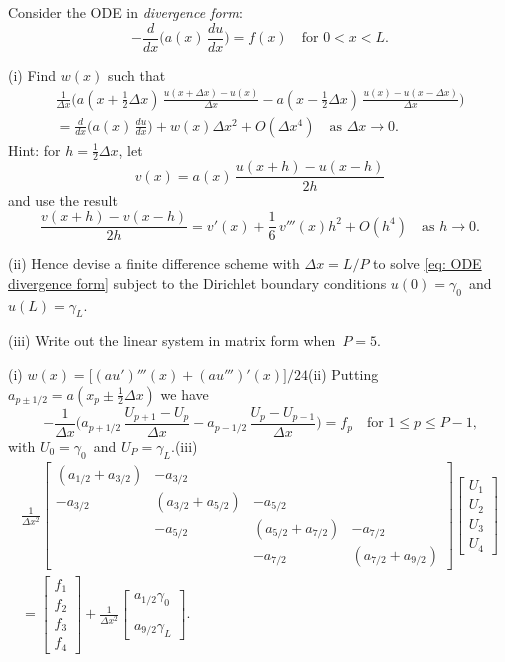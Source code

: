 \begin{Exercises}
\exercise
Consider the ODE in \emph{divergence form}:
\begin{equation}\label{eq: ODE divergence form}
-\frac{d}{dx}\biggl(a(x)\,\frac{du}{dx}\biggr)=f(x)\quad\text{for $0<x<L$.}
\end{equation}
\begin{description}
\item{(i)}
Find $w(x)$ such that
\begin{multline*}
\frac{1}{\Delta x}\biggl(
 a(x+\tfrac12\Delta x)\,\frac{u(x+\Delta x)-u(x)}{\Delta x}
-a(x-\tfrac12\Delta x)\,\frac{u(x)-u(x-\Delta x)}{\Delta x}\biggr)\\
    =\frac{d}{dx}\biggl(a(x)\,\frac{du}{dx}\biggr)+w(x)\Delta x^2+O(\Delta x^4)
    \quad\text{as $\Delta x\to0$.}
\end{multline*}
Hint: for $h=\tfrac12\Delta x$, let 
\[
v(x)=a(x)\,\frac{u(x+h)-u(x-h)}{2h}
\]
and use the result
\[
\frac{v(x+h)-v(x-h)}{2h}=v'(x)+\frac{1}{6}\,v'''(x)h^2+O(h^4)
    \quad\text{as $h\to0$.}
\]
\item{(ii)} Hence devise a finite difference scheme with $\Delta x=L/P$ to 
solve \eqref{eq: ODE divergence form} subject to the Dirichlet boundary 
conditions $u(0)=\gamma_0$~and $u(L)=\gamma_L$.
\item{(iii)} Write out the linear system in matrix form when~$P=5$.
\end{description}
\begin{ans}
(i) $w(x)=\bigl[(au')'''(x)+(au''')'(x)\bigr]/24$\quad (ii) Putting
$a_{p\pm1/2}=a(x_p\pm\tfrac12\Delta x)$ we have
\[
-\frac{1}{\Delta x}\biggl(a_{p+1/2}\,\frac{U_{p+1}-U_p}{\Delta x}
    -a_{p-1/2}\,\frac{U_p-U_{p-1}}{\Delta x}\biggr)=f_p
    \quad\text{for $1\le p\le P-1$,}
\]
with $U_0=\gamma_0$~and $U_P=\gamma_L$.\quad (iii)
\begin{multline*}
\frac{1}{\Delta x^2}\begin{bmatrix}
            (a_{1/2}+a_{3/2})&-a_{3/2}&&\\
   -a_{3/2}&(a_{3/2}+a_{5/2})&-a_{5/2}&\\
  &-a_{5/2}&(a_{5/2}+a_{7/2})&-a_{7/2}\\
 &&-a_{7/2}&(a_{7/2}+a_{9/2})
\end{bmatrix}
\begin{bmatrix}U_1\\ U_2\\ U_3\\ U_4\end{bmatrix}\\
=\begin{bmatrix}f_1\\ f_2\\ f_3\\ f_4 \end{bmatrix}+\frac{1}{\Delta x^2}
\begin{bmatrix}a_{1/2}\gamma_0\\ \\ \\ a_{9/2}\gamma_L \end{bmatrix}.
\end{multline*}
\end{ans}

\end{Exercises}
